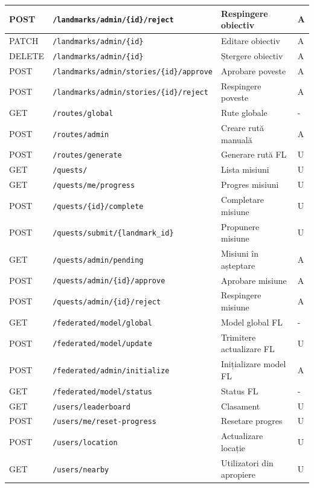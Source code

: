 \documentclass[12pt,a4paper]{report}
\begin{document}
\begin{appendices}
{\begin{longtable}{|p{1.1cm}|p{5.5cm}|p{4.5cm}|p{1cm}|}
\hline
POST & \texttt{/landmarks/admin/\{id\}/reject} & Respingere obiectiv & A \\
\hline
PATCH & \texttt{/landmarks/admin/\{id\}} & Editare obiectiv & A \\
\hline
DELETE & \texttt{/landmarks/admin/\{id\}} & Ștergere obiectiv & A \\
\hline
POST & \texttt{/landmarks/admin/stories/\{id\}/approve} & Aprobare poveste & A \\
\hline
POST & \texttt{/landmarks/admin/stories/\{id\}/reject} & Respingere poveste & A \\
\hline
GET & \texttt{/routes/global} & Rute globale & - \\
\hline
POST & \texttt{/routes/admin} & Creare rută manuală & A \\
\hline
POST & \texttt{/routes/generate} & Generare rută FL & U \\
\hline
GET & \texttt{/quests/} & Lista misiuni & U \\
\hline
GET & \texttt{/quests/me/progress} & Progres misiuni & U \\
\hline
POST & \texttt{/quests/\{id\}/complete} & Completare misiune & U \\
\hline
POST & \texttt{/quests/submit/\{landmark\_id\}} & Propunere misiune & U \\
\hline
GET & \texttt{/quests/admin/pending} & Misiuni în așteptare & A \\
\hline
POST & \texttt{/quests/admin/\{id\}/approve} & Aprobare misiune & A \\
\hline
POST & \texttt{/quests/admin/\{id\}/reject} & Respingere misiune & A \\
\hline
GET & \texttt{/federated/model/global} & Model global FL & - \\
\hline
POST & \texttt{/federated/model/update} & Trimitere actualizare FL & U \\
\hline
POST & \texttt{/federated/admin/initialize} & Inițializare model FL & A \\
\hline
GET & \texttt{/federated/model/status} & Status FL & - \\
\hline
GET & \texttt{/users/leaderboard} & Clasament & U \\
\hline
POST & \texttt{/users/me/reset-progress} & Resetare progres & U \\
\hline
POST & \texttt{/users/location} & Actualizare locație & U \\
\hline
GET & \texttt{/users/nearby} & Utilizatori din apropiere & U \\

\end{longtable}}
\end{appendices}
\end{document}
